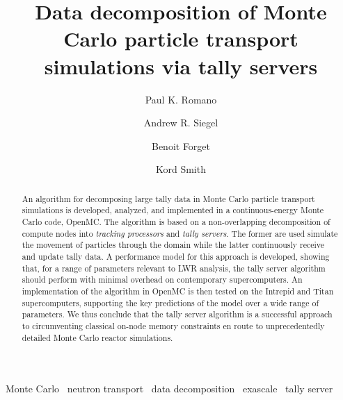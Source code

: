 \documentclass[3p,fleqn]{elsarticle}
\begin{document}
\begin{frontmatter}

\title{Data decomposition of Monte Carlo particle transport simulations via
  tally servers}
\author[mit]{Paul K. Romano}

\author[anl]{Andrew R. Siegel}

\author[mit]{Benoit Forget}

\author[mit]{Kord Smith}

\address[mit]{Massachusetts Institute of Technology, Department of Nuclear
  Science and Engineering, 77 Massachusetts Ave., Cambridge, MA 02139, United
  States}

\address[anl]{Argonne National Laboratory, Theory and Computing Sciences, 9700 S
  Cass Ave., Argonne, IL 60439, United States}

\begin{abstract}
An algorithm for decomposing large tally data in Monte Carlo particle transport
simulations is developed, analyzed, and implemented in a continuous-energy Monte
Carlo code, OpenMC. The algorithm is based on a non-overlapping decomposition of
compute nodes into \emph{tracking processors} and \emph{tally servers}. The
former are used simulate the movement of particles through the domain while the
latter continuously receive and update tally data. A performance model for this
approach is developed, showing that, for a range of parameters relevant to LWR
analysis, the tally server algorithm should perform with minimal overhead on
contemporary supercomputers. An implementation of the algorithm in OpenMC is
then tested on the Intrepid and Titan supercomputers, supporting the key
predictions of the model over a wide range of parameters. We thus conclude that
the tally server algorithm is a successful approach to circumventing classical
on-node memory constraints en route to unprecedentedly detailed Monte Carlo
reactor simulations.
\end{abstract}

\begin{keyword}
  Monte Carlo \ neutron transport \ data decomposition \ exascale \ tally server
\end{keyword}

\end{frontmatter}

\end{document}
